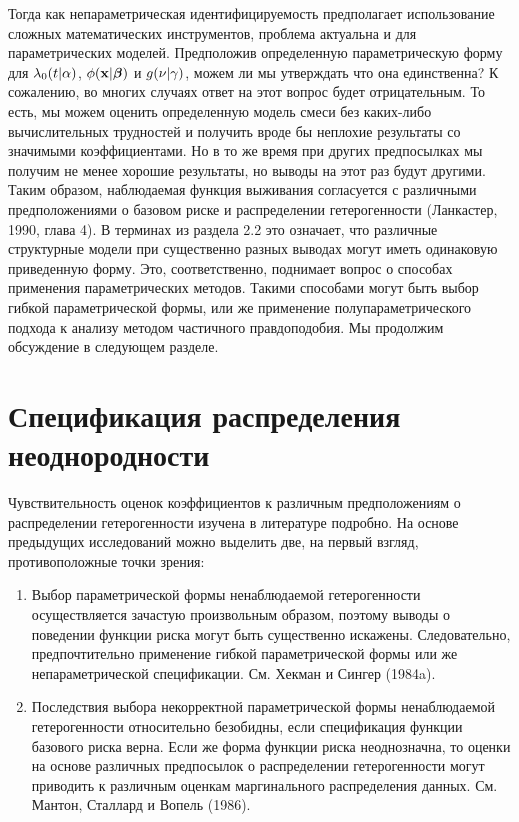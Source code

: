 Тогда как непараметрическая идентифицируемость предполагает использование сложных математических инструментов, проблема актуальна и для параметрических моделей. Предположив определенную параметрическую форму для $\lambda_0(t|\alpha)$, $\phi(\mathbf{x}|\bm{\beta})$ и $g(\nu|\gamma)$, можем ли мы утверждать что она единственна? К сожалению, во многих случаях ответ на этот вопрос будет отрицательным. То есть, мы можем оценить определенную модель смеси без каких-либо вычислительных трудностей и получить вроде бы неплохие результаты со значимыми коэффициентами. Но в то же время при других предпосылках мы получим не менее хорошие результаты, но выводы на этот раз будут другими. Таким образом, наблюдаемая функция выживания согласуется с различными предположениями о базовом риске и распределении гетерогенности (Ланкастер, 1990, глава 4). В терминах из раздела 2.2 %
это означает, что различные структурные модели при существенно разных выводах могут иметь одинаковую приведенную форму. Это, соответственно, поднимает вопрос о способах применения параметрических методов. Такими способами могут быть выбор гибкой параметрической формы, или же применение полупараметрического подхода к анализу методом частичного правдоподобия. Мы продолжим обсуждение в следующем разделе.




\section{Спецификация распределения неоднородности}\label{sec:18.4}

\noindent
Чувствительность оценок коэффициентов к различным предположениям о распределении гетерогенности изучена в литературе подробно. На основе предыдущих исследований можно выделить две, на первый взгляд, противоположные точки зрения:

\begin{enumerate}
    \item
Выбор параметрической формы ненаблюдаемой гетерогенности осуществляется зачастую произвольным образом, поэтому выводы о поведении функции риска могут быть существенно искажены. Следовательно, предпочтительно применение гибкой параметрической формы или же непараметрической спецификации. См. Хекман и Сингер (1984a).

    \item
Последствия выбора некорректной параметрической формы ненаблюдаемой гетерогенности относительно безобидны, если спецификация функции базового риска верна. Если же форма функции риска неоднозначна, то оценки на основе различных предпосылок о распределении гетерогенности могут приводить к различным оценкам маргинального распределения данных. См. Мантон, Сталлард и Вопель (1986).
\end{enumerate}

